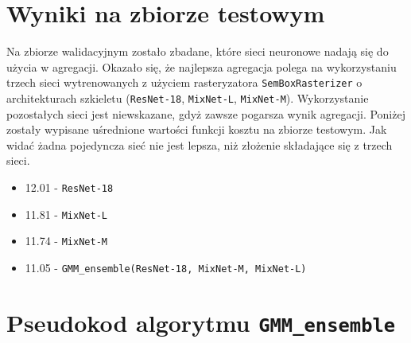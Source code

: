 \section{Wyniki na zbiorze testowym}
Na zbiorze walidacyjnym zostało zbadane, które sieci neuronowe nadają się do użycia w agregacji. Okazało się, że najlepsza agregacja polega na wykorzystaniu trzech sieci wytrenowanych z użyciem rasteryzatora \texttt{SemBoxRasterizer} o architekturach szkieletu (\texttt{ResNet-18}, \texttt{MixNet-L}, \texttt{MixNet-M}). Wykorzystanie pozostałych sieci jest niewskazane, gdyż zawsze pogarsza wynik agregacji. Poniżej zostały wypisane uśrednione wartości funkcji kosztu na zbiorze testowym. Jak widać żadna pojedyncza sieć nie jest lepsza, niż złożenie składające się z trzech sieci.

\begin{itemize}
    \setlength{\itemsep}{1pt}
    \setlength{\parskip}{0pt}
    \setlength{\parsep}{0pt}
    \item 12.01 - \texttt{ResNet-18}
    \item 11.81 - \texttt{MixNet-L}
    \item 11.74 - \texttt{MixNet-M}
    \item 11.05 - \texttt{GMM\_ensemble(ResNet-18, MixNet-M, MixNet-L)}
\end{itemize}

\newpage
\section{Pseudokod algorytmu \texttt{GMM\_ensemble}}

